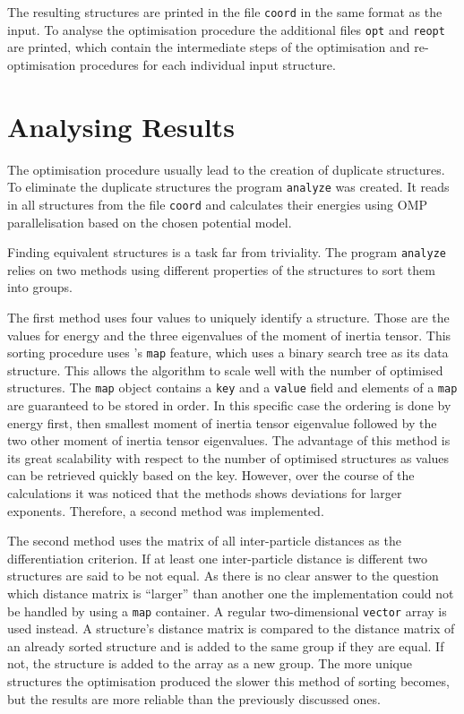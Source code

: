 The resulting structures are printed in the file \verb|coord| in the same
format as the input. To analyse the optimisation procedure the additional files
\verb|opt| and \verb|reopt| are printed, which contain the intermediate steps
of the optimisation and re-optimisation procedures for each individual input
structure.

\section{Analysing Results}
\label{sec:analysingresults}

The optimisation procedure usually lead to the creation of duplicate
structures. To eliminate the duplicate structures the program \verb|analyze|
was created. It reads in all structures from the file \verb|coord| and
calculates their energies using \ac{OMP} parallelisation based on the chosen
potential model.

Finding equivalent structures is a task far from triviality. The program
\verb|analyze| relies on two methods using different properties of the
structures to sort them into groups.

The first method uses four values to uniquely identify a structure. Those are
the values for energy and the three eigenvalues of the moment of inertia
tensor. This sorting procedure uses \Cpp's \verb|map| feature, which uses a
binary search tree as its data structure. This allows the algorithm to scale
well with the number of optimised structures. The \Cpp \verb|map| object
contains a \verb|key| and a \verb|value| field and elements of a \verb|map| are
guaranteed to be stored in order.\autocite{Stroustrup_programminglanguage_2000}
In this specific case the ordering is done by energy first, then smallest
moment of inertia tensor eigenvalue followed by the two other moment of inertia
tensor eigenvalues. The advantage of this method is its great scalability with
respect to the number of optimised structures as values can be retrieved
quickly based on the key.  However, over the course of the calculations it was
noticed that the methods shows deviations for larger exponents. Therefore, a
second method was implemented.

The second method uses the matrix of all inter-particle distances as the
differentiation criterion. If at least one inter-particle distance is different
two structures are said to be not equal. As there is no clear answer to the
question which distance matrix is ``larger'' than another one the
implementation could not be handled by using a \verb|map| container. A regular
two-dimensional \verb|vector| array is used instead. A structure's distance
matrix is compared to the distance matrix of an already sorted structure and is
added to the same group if they are equal. If not, the structure is added to
the array as a new group. The more unique structures the optimisation produced
the slower this method of sorting becomes, but the results are more reliable
than the previously discussed ones.

